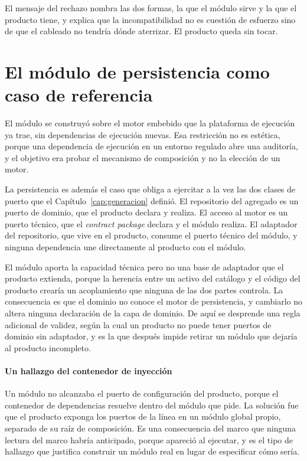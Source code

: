 El mensaje del rechazo nombra las dos formas, la que el módulo sirve y la que
el producto tiene, y explica que la incompatibilidad no es cuestión de
esfuerzo sino de que el cableado no tendría dónde aterrizar. El producto queda
sin tocar.

\section{El módulo de persistencia como caso de referencia}
\label{sec:modulo-persistencia}

El módulo se construyó sobre el motor embebido que la plataforma de ejecución
ya trae, sin dependencias de ejecución nuevas. Esa restricción no es
estética, porque una dependencia de ejecución en un entorno regulado abre una
auditoría, y el objetivo era probar el mecanismo de composición y no la
elección de un motor.

La persistencia es además el caso que obliga a ejercitar a la vez las dos
clases de puerto que el Capítulo~\ref{cap:generacion} definió. El repositorio
del agregado es un puerto de dominio, que el producto declara y realiza. El
acceso al motor es un puerto técnico, que el \emph{contract package} declara y
el módulo realiza. El adaptador del repositorio, que vive en el producto,
consume el puerto técnico del módulo, y ninguna dependencia une directamente
al producto con el módulo.

El módulo aporta la capacidad técnica pero no una base de adaptador que el
producto extienda, porque la herencia entre un activo del catálogo y el
código del producto crearía un acoplamiento que ninguna de las dos partes
controla. La consecuencia es que el dominio no conoce el motor de
persistencia, y cambiarlo no altera ninguna declaración de la capa de
dominio. De aquí se desprende una regla adicional de validez, según la cual
un producto no puede tener puertos de dominio sin adaptador, y es la que
después impide retirar un módulo que dejaría al producto incompleto.

\paragraph*{Un hallazgo del contenedor de inyección}

Un módulo no alcanzaba el puerto de configuración del producto, porque el
contenedor de dependencias resuelve dentro del módulo que pide. La solución
fue que el producto exponga los puertos de la línea en un módulo global
propio, separado de su raíz de composición. Es una consecuencia del marco que
ninguna lectura del marco habría anticipado, porque apareció al ejecutar, y es
el tipo de hallazgo que justifica construir un módulo real en lugar de
especificar cómo sería.

